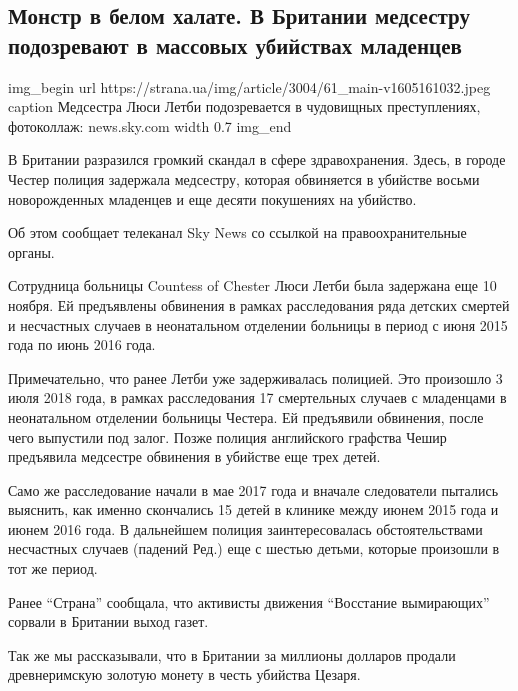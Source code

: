  
 
 

\subsection{Монстр в белом халате. В Британии медсестру подозревают в массовых убийствах младенцев}

\ifcmt
img_begin 
	url https://strana.ua/img/article/3004/61_main-v1605161032.jpeg
	caption Медсестра Люси Летби подозревается в чудовищных преступлениях, фотоколлаж: news.sky.com 
	width 0.7
img_end
\fi

В Британии разразился громкий скандал в сфере здравохранения. Здесь, в городе
Честер полиция задержала медсестру, которая обвиняется в убийстве восьми
новорожденных младенцев и еще десяти покушениях на убийство.

Об этом сообщает телеканал Sky News со ссылкой на правоохранительные органы.

Сотрудница больницы Countess of Chester Люси Летби была задержана еще 10
ноября. Ей предъявлены обвинения в рамках расследования ряда детских смертей и
несчастных случаев в неонатальном отделении больницы в период с июня 2015 года
по июнь 2016 года.

Примечательно, что ранее Летби уже задерживалась полицией. Это произошло 3 июля
2018 года, в рамках расследования 17 смертельных случаев с младенцами в
неонатальном отделении больницы Честера. Ей предъявили обвинения, после чего
выпустили под залог. Позже полиция английского графства Чешир предъявила
медсестре обвинения в убийстве еще трех детей.

Само же расследование начали в мае 2017 года и вначале следователи пытались
выяснить, как именно скончались 15 детей в клинике между июнем 2015 года и
июнем 2016 года. В дальнейшем полиция заинтересовалась обстоятельствами
несчастных случаев (падений \dshM Ред.) еще с шестью детьми, которые произошли в
тот же период.

Ранее \enquote{Страна} сообщала, что активисты движения \enquote{Восстание вымирающих} сорвали
в Британии выход газет.

Так же мы рассказывали, что в Британии за миллионы долларов продали
древнеримскую золотую монету в честь убийства Цезаря.


